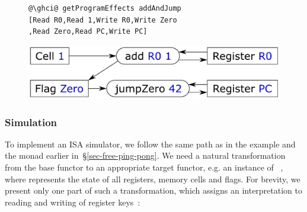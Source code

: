 \vspace{-1mm}
\begin{figure}[!h]
 \begin{minipage}{0.46\textwidth}
\raggedleft
\begin{verbatim}
@\ghci@ getProgramEffects addAndJump
[Read R0,Read 1,Write R0,Write Zero
,Read Zero,Read PC,Write PC]
\end{verbatim}
 \end{minipage}
 \begin{minipage}{0.50\textwidth}
  \centering
  \includegraphics[scale=0.3]{fig/addAndJump.pdf}
 \end{minipage}
\end{figure}
\vspace{-1mm}


\subsubsection{Simulation}

To implement an ISA simulator, we follow the same path as in the 
example and the  monad earlier in~\S\ref{sec-free-ping-pong}. We need a
natural transformation from the base functor  to an appropriate target
functor, e.g. an instance of ~, where 
represents the state of all registers, memory cells and flags. For brevity, we
present only one part of such a transformation, which assigns an interpretation
to reading and writing of register keys~:

